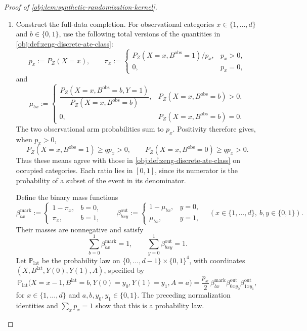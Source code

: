 \begin{proof}[Proof of \cref{obj:lem:synthetic-randomization-kernel}]
\begin{enumerate}
\item Construct the full-data completion. For observational categories \(x\in\{1,\ldots,d\}\) and \(b\in\{0,1\}\), use the following total versions of the quantities in \cref{obj:def:zeng-discrete-ate-class}:
\[
p_x:=P_Z(X=x),\qquad
\pi_x:=
\begin{cases}
P_Z(X=x,B^{\mathrm{obs}}=1)/p_x,&p_x>0,\\
0,&p_x=0,
\end{cases}
\]
and
\[
\mu_{bx}:=
\begin{cases}
\dfrac{P_Z(X=x,B^{\mathrm{obs}}=b,Y=1)}
      {P_Z(X=x,B^{\mathrm{obs}}=b)},
&P_Z(X=x,B^{\mathrm{obs}}=b)>0,\\[6pt]
0,&P_Z(X=x,B^{\mathrm{obs}}=b)=0.
\end{cases}
\]
The two observational arm probabilities sum to \(p_x\). Positivity therefore gives, when \(p_x>0\),
\[
P_Z(X=x,B^{\mathrm{obs}}=1)\ge qp_x>0,\qquad
P_Z(X=x,B^{\mathrm{obs}}=0)\ge qp_x>0.
\]
Thus these means agree with those in \cref{obj:def:zeng-discrete-ate-class} on occupied categories. Each ratio lies in \([0,1]\), since its numerator is the probability of a subset of the event in its denominator.

Define the binary mass functions
\[
\beta^{\mathrm{mark}}_{bx}:=
\begin{cases}
1-\pi_x,&b=0,\\
\pi_x,&b=1,
\end{cases}
\qquad
\beta^{\mathrm{out}}_{bxy}:=
\begin{cases}
1-\mu_{bx},&y=0,\\
\mu_{bx},&y=1,
\end{cases}
\quad
(x\in\{1,\ldots,d\},\ b,y\in\{0,1\}).
\]
Their masses are nonnegative and satisfy
\[
\sum_{b=0}^1\beta^{\mathrm{mark}}_{bx}=1,
\qquad
\sum_{y=0}^1\beta^{\mathrm{out}}_{bxy}=1.
\]
Let \(\mathbb P_{\mathrm{lat}}\) be the probability law on
\(\{0,\ldots,d-1\}\times\{0,1\}^4\), with coordinates
\((X,B^{\mathrm{lat}},Y(0),Y(1),A)\), specified by
\[
\mathbb P_{\mathrm{lat}}
\bigl(X=x-1,B^{\mathrm{lat}}=b,Y(0)=y_0,Y(1)=y_1,A=a\bigr)
=
\frac{p_x}{2}\,
\beta^{\mathrm{mark}}_{bx}
\beta^{\mathrm{out}}_{0xy_0}
\beta^{\mathrm{out}}_{1xy_1},
\]
for \(x\in\{1,\ldots,d\}\) and \(a,b,y_0,y_1\in\{0,1\}\).
The preceding normalization identities and \(\sum_xp_x=1\) show that this is a probability law.


\end{enumerate}
\end{proof}
